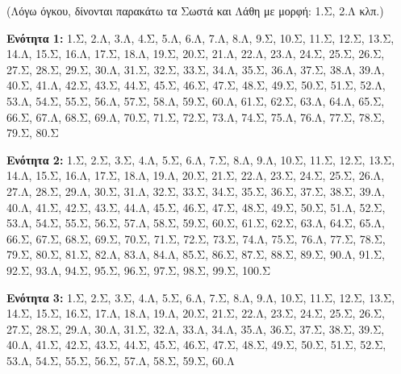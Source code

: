 \documentclass[11pt,a4paper]{article}
\begin{document}
\vspace{0.3cm}
\begin{tcolorbox}[colback=black!5!white, colframe=black, title=\textbf{Συνοπτικό Κλειδί Απαντήσεων}]
(Λόγω όγκου, δίνονται παρακάτω τα Σωστά και Λάθη με μορφή: 1.Σ, 2.Λ κλπ.)

\textbf{Ενότητα 1:}
1.Σ, 2.Λ, 3.Λ, 4.Σ, 5.Λ, 6.Λ, 7.Λ, 8.Λ, 9.Σ, 10.Σ, 
11.Σ, 12.Σ, 13.Σ, 14.Λ, 15.Σ, 16.Λ, 17.Σ, 18.Λ, 19.Σ, 20.Σ, 
21.Λ, 22.Λ, 23.Λ, 24.Σ, 25.Σ, 26.Σ, 27.Σ, 28.Σ, 29.Σ, 30.Λ, 
31.Σ, 32.Σ, 33.Σ, 34.Λ, 35.Σ, 36.Λ, 37.Σ, 38.Λ, 39.Λ, 40.Σ, 
41.Λ, 42.Σ, 43.Σ, 44.Σ, 45.Σ, 46.Σ, 47.Σ, 48.Σ, 49.Σ, 50.Σ, 
51.Σ, 52.Λ, 53.Λ, 54.Σ, 55.Σ, 56.Λ, 57.Σ, 58.Λ, 59.Σ, 60.Λ, 
61.Σ, 62.Σ, 63.Λ, 64.Λ, 65.Σ, 66.Σ, 67.Λ, 68.Σ, 69.Λ, 70.Σ,
71.Σ, 72.Σ, 73.Λ, 74.Σ, 75.Λ, 76.Λ, 77.Σ, 78.Σ, 79.Σ, 80.Σ

\textbf{Ενότητα 2:}
1.Σ, 2.Σ, 3.Σ, 4.Λ, 5.Σ, 6.Λ, 7.Σ, 8.Λ, 9.Λ, 10.Σ,
11.Σ, 12.Σ, 13.Σ, 14.Λ, 15.Σ, 16.Λ, 17.Σ, 18.Λ, 19.Λ, 20.Σ,
21.Σ, 22.Λ, 23.Σ, 24.Σ, 25.Σ, 26.Λ, 27.Λ, 28.Σ, 29.Λ, 30.Σ,
31.Λ, 32.Σ, 33.Σ, 34.Σ, 35.Σ, 36.Σ, 37.Σ, 38.Σ, 39.Λ, 40.Λ,
41.Σ, 42.Σ, 43.Σ, 44.Λ, 45.Σ, 46.Σ, 47.Σ, 48.Σ, 49.Σ, 50.Σ,
51.Λ, 52.Σ, 53.Λ, 54.Σ, 55.Σ, 56.Σ, 57.Λ, 58.Σ, 59.Σ, 60.Σ,
61.Σ, 62.Σ, 63.Λ, 64.Σ, 65.Λ, 66.Σ, 67.Σ, 68.Σ, 69.Σ, 70.Σ,
71.Σ, 72.Σ, 73.Σ, 74.Λ, 75.Σ, 76.Λ, 77.Σ, 78.Σ, 79.Σ, 80.Σ,
81.Σ, 82.Λ, 83.Λ, 84.Λ, 85.Σ, 86.Σ, 87.Σ, 88.Σ, 89.Σ, 90.Λ,
91.Σ, 92.Σ, 93.Λ, 94.Σ, 95.Σ, 96.Σ, 97.Σ, 98.Σ, 99.Σ, 100.Σ

\textbf{Ενότητα 3:}
1.Σ, 2.Σ, 3.Σ, 4.Λ, 5.Σ, 6.Λ, 7.Σ, 8.Λ, 9.Λ, 10.Σ,
11.Σ, 12.Σ, 13.Σ, 14.Σ, 15.Σ, 16.Σ, 17.Λ, 18.Λ, 19.Λ, 20.Σ,
21.Σ, 22.Λ, 23.Σ, 24.Σ, 25.Σ, 26.Σ, 27.Σ, 28.Σ, 29.Λ, 30.Λ,
31.Σ, 32.Λ, 33.Λ, 34.Λ, 35.Λ, 36.Σ, 37.Σ, 38.Σ, 39.Σ, 40.Λ,
41.Σ, 42.Σ, 43.Σ, 44.Σ, 45.Σ, 46.Σ, 47.Σ, 48.Σ, 49.Σ, 50.Σ,
51.Σ, 52.Σ, 53.Λ, 54.Σ, 55.Σ, 56.Σ, 57.Λ, 58.Σ, 59.Σ, 60.Λ
\end{tcolorbox}
\end{document}

